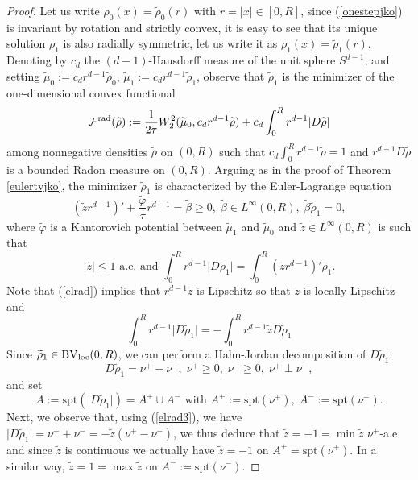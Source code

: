 \documentclass[12pt, a4paper]{article}
\numberwithin{equation}{section}
\theoremstyle{plain}
\theoremstyle{definition}
\theoremstyle{remark}
\newcommand\F{{\cal F}}
\newcommand\Fr{{\F}^{\rm{rad}}}
\newcommand\tilm{{\widetilde{\mu}}}
\newcommand\tilr{{\widetilde{\rho}}}
\newcommand\tilfi{{\widetilde{\varphi}}}
\newcommand\tilz{{\widetilde{z}}}
\newcommand\tilb{{\widetilde{\beta}}}
\newcommand{\BV}{\mathrm{BV}}
\newcommand{\spt}{\mathrm{spt}}
\newcommand\pref[1]{(\ref{#1})}
\begin{document}
 \begin{proof}

 Let us write $\rho_0(x)=\tilr_0(r)$ with $r=\vert x \vert\in [0,R]$, since \pref{onestepjko} is invariant by rotation and strictly convex, it is easy to see that its unique solution $\rho_1$ is also radially symmetric, let us write it as  $\rho_1(x)=\tilr_1(r)$. Denoting by $c_d$ the $(d-1)$-Hausdorff measure of the unit sphere $S^{d-1}$,  and setting $\tilm_0:=c_d r^{d-1} \tilr_0$, $\tilm_1:=c_d r^{d-1} \tilr_1$,  observe that $\tilr_1$ is the minimizer of the one-dimensional convex functional
 \[\Fr(\tilr):=\frac{1}{2\tau} W_2^2(\tilm_0, c_d r^{d-1} \tilr)+c_d \int_0^R r^{d-1} \vert D \tilr \vert\]
 among nonnegative densities  $\tilr$ on $(0,R)$ such that $c_d \int_0^R r^{d-1} \tilr=1$ and $r^{d-1} D \tilr$ is a bounded Radon measure on $(0,R)$. Arguing as in the proof of Theorem \ref{eulertvjko}, the minimizer $\tilr_1$ is characterized by the Euler-Lagrange equation
 \begin{equation}\label{elrad}
 (\tilz r^{d-1})' + \frac{\tilfi}{\tau} r^{d-1}=\tilb \ge 0, \; \tilb \in L^{\infty}(0, R), \; \tilb \tilr_1=0,
  \end{equation}
 where $\tilfi$ is a Kantorovich potential between $\tilm_1$ and $\tilm_0$ and $\tilz  \in L^{\infty}(0, R)$ is such that
 \begin{equation}\label{elrad2}
 \vert \tilz\vert \le 1 \mbox{ a.e. and  } \int_0^R r^{d-1} \vert D \tilr_1 \vert=\int_0^R (\tilz r^{d-1})' \tilr_1.  
 \end{equation}
 Note that \pref{elrad} implies that $r^{d-1}\tilz$ is Lipschitz so that $\tilz$ is locally Lipschitz and 
 \begin{equation}\label{elrad3}
 \int_0^R r^{d-1} \vert D \tilr_1 \vert=-\int_0^R  r^{d-1} \tilz D \tilr_1
 \end{equation}
  Since $\tilr_1\in \BV_{\rm{loc}}(0,R)$,  we can perform a Hahn-Jordan decomposition of  $D\tilr_1$:
\begin{equation}\label{jordan}
D\tilr_1=\nu^+-\nu^-, \; \nu^+\ge 0, \; \nu^{-}\ge 0, \; \nu^+ \perp \nu^-,
\end{equation}
and set 
\begin{equation}\label{defapm}
A:=\spt(\vert D\tilr_1 \vert)=A^+\cup A^- \mbox{ with } A^+:=\spt(\nu^+), \; A^-:=\spt(\nu^-).
\end{equation}
Next, we observe that, using \pref{elrad3},  we have $\vert D \tilr_1\vert=\nu^+ +\nu^-= -\tilz(\nu^+-\nu^-)$, we thus deduce  that $\tilz=-1=\min \tilz $ $\nu^+$-a.e and since $\tilz$ is continuous we  actually have $\tilz=-1$ on $A^+=\spt(\nu^+)$. In a similar way, $\tilz=1=\max \tilz $ on $A^-:=\spt(\nu^-)$. 


\end{proof}
\end{document}
